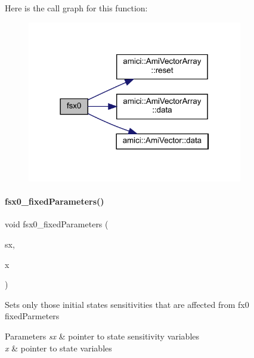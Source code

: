 Here is the call graph for this function\+:
\nopagebreak
\begin{figure}[H]
\begin{center}
\leavevmode
\includegraphics[width=266pt]{classamici_1_1_model_a6f46a63f0524ad25e4125254b78fdee9_cgraph}
\end{center}
\end{figure}
\mbox{\label{classamici_1_1_model_acd951497e01220e545bbb238cc48e7bb}} 
\paragraph{\texorpdfstring{fsx0\+\_\+fixed\+Parameters()}{fsx0\_fixedParameters()}\hspace{0.1cm}{\footnotesize\ttfamily [1/2]}}
{\footnotesize\ttfamily void fsx0\+\_\+fixed\+Parameters (\begin{DoxyParamCaption}\item[{\mbox{\hyperlink{classamici_1_1_ami_vector_array}{Ami\+Vector\+Array}} $\ast$}]{sx,  }\item[{const \mbox{\hyperlink{classamici_1_1_ami_vector}{Ami\+Vector}} $\ast$}]{x }\end{DoxyParamCaption})}

Sets only those initial states sensitivities that are affected from fx0 fixed\+Parmeters 
\begin{DoxyParams}{Parameters}
{\em sx} & pointer to state sensitivity variables \\
\hline
{\em x} & pointer to state variables \\
\hline
\end{DoxyParams}


